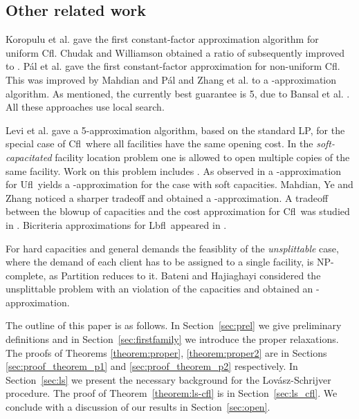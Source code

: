 \documentclass[11pt]{article}\usepackage{amsmath}
\newcommand{\lbfl}{{\sc Lbfl}}
\newcommand{\cfl}{{\sc Cfl}}
\newcommand{\ufl}{{\sc Ufl}}
\begin{document}
 






\subsection{Other related work}
Koropulu et al. \cite{KoropuluPR00} gave the first constant-factor approximation
algorithm for uniform \cfl. Chudak and Williamson
\cite{ChudakW05} obtained a ratio of   subsequently  improved to 
\cite{CharikarG99}.
 P\'{a}l et al. \cite{PalTW01} gave
the first constant-factor approximation for non-uniform \cfl. This was improved
by Mahdian and P\'{a}l \cite{MahdianP03} and Zhang et al. \cite{ZhangCY04} to a
-approximation algorithm. As mentioned, the currently best guarantee is 5,
due  to Bansal et al. \cite{BansalGG12}. All these approaches use local search. 

Levi et al.  \cite{LeviSS12} gave a  5-approximation 
algorithm, based on the standard LP, for the special case of \cfl\ where
all facilities have the same opening cost. 
In the {\em soft-capacitated} facility location problem one is allowed to open
multiple copies of the same facility. 
Work on this problem 
includes \cite{ShmoysTA97,ChudakS99, ChudakW05, JainV01}.  
As observed in \cite{JainMMSV03}  a -approximation for  \ufl\ yields a
-approximation for the case with soft capacities. Mahdian, Ye and Zhang
\cite{MahdianYZ03} noticed a sharper tradeoff and obtained a
-approximation. A tradeoff between the blowup  of capacities and
the cost approximation for \cfl\ was studied in
\cite{AbramsMMP02}. Bicriteria approximations for \lbfl\  appeared in
\cite{KargerM00,GuhaMM00}. 

For hard capacities and general demands the feasiblity of the
{\em unsplittable} case, where the demand of each client has to be assigned to a
single facility, is NP-complete, as {\sc Partition} reduces to it. 
Bateni and Hajiaghayi \cite{BateniH12} considered the unsplittable problem 
with an  violation of the capacities and obtained an
-approximation. 


\bigskip

The outline of this paper is as follows. In Section~\ref{sec:prel} we give
preliminary definitions and in Section~\ref{sec:firstfamily} we introduce the proper
relaxations. The proofs of Theorems \ref{theorem:proper}, \ref{theorem:proper2} are  in Sections
\ref{sec:proof_theorem_p1} and \ref{sec:proof_theorem_p2} respectively. In Section~\ref{sec:ls} we present the
necessary background for the Lov\'{a}sz-Schrijver procedure. The proof of
Theorem~\ref{theorem:ls-cfl} is in Section~\ref{sec:ls_cfl}. We conclude with a 
discussion of our results in Section~\ref{sec:open}. 
\end{document}
